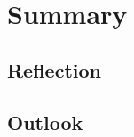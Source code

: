 



\section{Summary}
\label{chapter5-summary}

\subsection{Reflection}
\label{chapter5-reflection}

\subsection{Outlook}
\label{chapter5-outlook}

